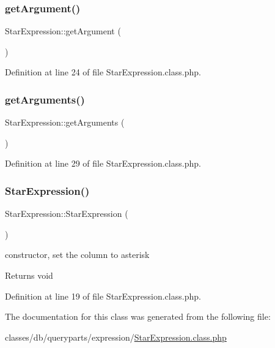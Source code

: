 \subsubsection{\texorpdfstring{get\+Argument()}{getArgument()}}
{\footnotesize\ttfamily Star\+Expression\+::get\+Argument (\begin{DoxyParamCaption}{ }\end{DoxyParamCaption})}



Definition at line 24 of file Star\+Expression.\+class.\+php.

\mbox{\label{classStarExpression_ac356994bb75dacb90fd7ac6aa3dbb49c}} 
\subsubsection{\texorpdfstring{get\+Arguments()}{getArguments()}}
{\footnotesize\ttfamily Star\+Expression\+::get\+Arguments (\begin{DoxyParamCaption}{ }\end{DoxyParamCaption})}



Definition at line 29 of file Star\+Expression.\+class.\+php.

\mbox{\label{classStarExpression_a7c9d934f3e104f7987f4266ef9e28eff}} 
\subsubsection{\texorpdfstring{Star\+Expression()}{StarExpression()}}
{\footnotesize\ttfamily Star\+Expression\+::\+Star\+Expression (\begin{DoxyParamCaption}{ }\end{DoxyParamCaption})}

constructor, set the column to asterisk \begin{DoxyReturn}{Returns}
void 
\end{DoxyReturn}


Definition at line 19 of file Star\+Expression.\+class.\+php.



The documentation for this class was generated from the following file\+:\begin{DoxyCompactItemize}
\item 
classes/db/queryparts/expression/\hyperlink{StarExpression_8class_8php}{Star\+Expression.\+class.\+php}\end{DoxyCompactItemize}
